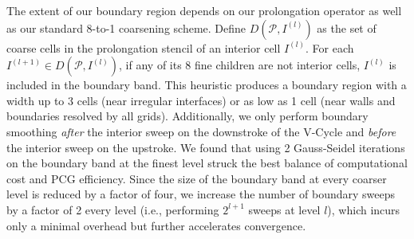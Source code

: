 The extent of our boundary region depends on our prolongation operator as well as our standard 8-to-1 coarsening scheme. Define $D(\mathcal{P},I^{(l)})$ as the set of coarse cells in the prolongation stencil of an interior cell $I^{(l)}$.  For each $I^{(l+1)}\in D(\mathcal{P},I^{(l)})$, if any of its 8 fine children are not interior cells, $I^{(l)}$ is included in the boundary band.
This heuristic produces a boundary region with a width up to 3 cells (near irregular interfaces) or as low as 1 cell (near walls and boundaries resolved by all grids).
Additionally, we only perform boundary smoothing \emph{after} the interior sweep on the downstroke of the V-Cycle and \emph{before} the interior
sweep on the upstroke. 
We found that using 2 Gauss-Seidel
iterations on the boundary band at the finest level struck the best balance of computational cost and PCG efficiency. 
Since the size of the boundary band at every coarser level is reduced by a factor of four, we
increase the number of boundary sweeps by a factor of 2 every level (i.e., performing $2^{l+1}$ sweeps at level $l$), which incurs only a minimal overhead but further accelerates convergence.

